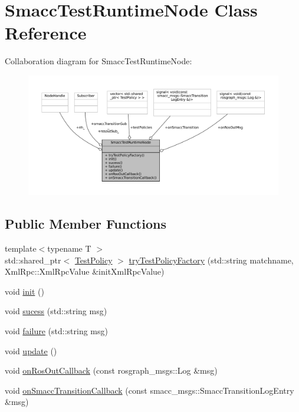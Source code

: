 \hypertarget{classSmaccTestRuntimeNode}{}\section{Smacc\+Test\+Runtime\+Node Class Reference}
\label{classSmaccTestRuntimeNode}


Collaboration diagram for Smacc\+Test\+Runtime\+Node\+:
\nopagebreak
\begin{figure}[H]
\begin{center}
\leavevmode
\includegraphics[width=350pt]{classSmaccTestRuntimeNode__coll__graph}
\end{center}
\end{figure}
\subsection*{Public Member Functions}
\begin{DoxyCompactItemize}
\item 
{\footnotesize template$<$typename T $>$ }\\std\+::shared\+\_\+ptr$<$ \hyperlink{classTestPolicy}{Test\+Policy} $>$ \hyperlink{classSmaccTestRuntimeNode_ab92c2ceafa6b65919f306c1818fae551}{try\+Test\+Policy\+Factory} (std\+::string matchname, Xml\+Rpc\+::\+Xml\+Rpc\+Value \&init\+Xml\+Rpc\+Value)
\item 
void \hyperlink{classSmaccTestRuntimeNode_a8a75b2f3884af285826c7168753b8886}{init} ()
\item 
void \hyperlink{classSmaccTestRuntimeNode_ae77d02680e11f7e128841b0ab9ed6e13}{sucess} (std\+::string msg)
\item 
void \hyperlink{classSmaccTestRuntimeNode_a58254eca6e6a5f2bde6417a1cccc932a}{failure} (std\+::string msg)
\item 
void \hyperlink{classSmaccTestRuntimeNode_a0cdde5c108219ca3d7db941676fc1dcf}{update} ()
\item 
void \hyperlink{classSmaccTestRuntimeNode_a9d03a2f6a41e75c488f932b7efcb1292}{on\+Ros\+Out\+Callback} (const rosgraph\+\_\+msgs\+::\+Log \&msg)
\item 
void \hyperlink{classSmaccTestRuntimeNode_a09b21826547d6ac7de6049611bb1cde8}{on\+Smacc\+Transition\+Callback} (const smacc\+\_\+msgs\+::\+Smacc\+Transition\+Log\+Entry \&msg)
\end{DoxyCompactItemize}
